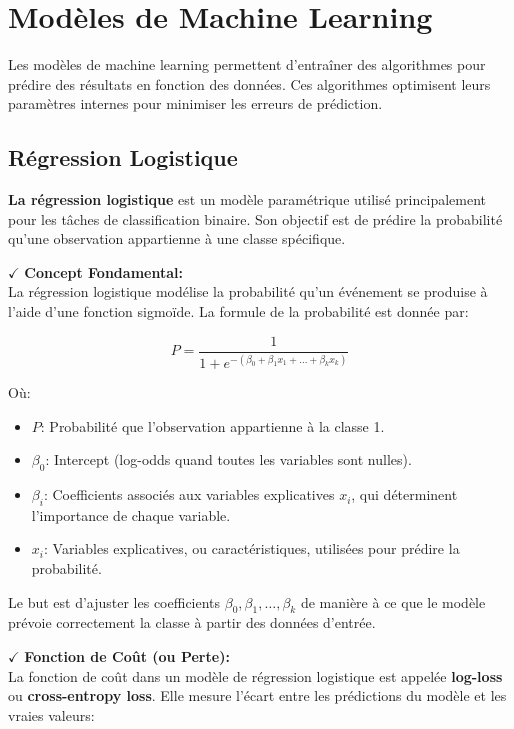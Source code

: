 \section{Modèles de Machine Learning}
Les modèles de machine learning permettent d’entraîner des algorithmes pour prédire des résultats en fonction des données. Ces algorithmes optimisent leurs paramètres internes pour minimiser les erreurs de prédiction.

\subsection{Régression Logistique}

\textbf{La régression logistique} est un modèle paramétrique utilisé principalement pour les tâches de classification binaire. Son objectif est de prédire la probabilité qu'une observation appartienne à une classe spécifique.

\textbf{\(\checkmark\)} \textbf{Concept Fondamental:}\\
La régression logistique modélise la probabilité qu’un événement se produise à l'aide d'une fonction sigmoïde. La formule de la probabilité est donnée par:

\[
P = \frac{1}{1 + e^{-(\beta_0 + \beta_1 x_1 + \dots + \beta_k x_k)}}
\]

Où:
\begin{itemize}
    \item \( P \): Probabilité que l'observation appartienne à la classe 1.
    \item \( \beta_0 \): Intercept (log-odds quand toutes les variables sont nulles).
    \item \( \beta_i \): Coefficients associés aux variables explicatives \( x_i \), qui déterminent l'importance de chaque variable.
    \item \( x_i \): Variables explicatives, ou caractéristiques, utilisées pour prédire la probabilité.
\end{itemize}

Le but est d’ajuster les coefficients \( \beta_0, \beta_1, \dots, \beta_k \) de manière à ce que le modèle prévoie correctement la classe à partir des données d'entrée.

\textbf{\(\checkmark\)} \textbf{Fonction de Coût (ou Perte):}\\
La fonction de coût dans un modèle de régression logistique est appelée \textbf{log-loss} ou \textbf{cross-entropy loss}. Elle mesure l’écart entre les prédictions du modèle et les vraies valeurs:

